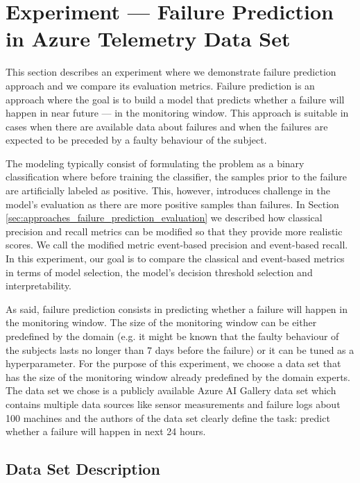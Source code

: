 \section{Experiment --- Failure Prediction in Azure Telemetry Data Set}
\label{sec:experiments_failure_prediction}

This section describes an experiment where we demonstrate failure prediction approach and we compare its evaluation metrics.
Failure prediction is an approach where the goal is to build a model that predicts whether a failure will happen in near future --- in the monitoring window.
This approach is suitable in cases when there are available data about failures and when the failures are expected to be preceded by a faulty behaviour of the subject.

The modeling typically consist of formulating the problem as a binary classification where before training the classifier, the samples prior to the failure are artificially labeled as positive.
This, however, introduces challenge in the model's evaluation as there are more positive samples than failures.
In Section \ref{sec:approaches_failure_prediction_evaluation} we described how classical precision and recall metrics can be modified so that they provide more realistic scores.
We call the modified metric event-based precision and event-based recall.
In this experiment, our goal is to compare the classical and event-based metrics in terms of model selection, the model's decision threshold selection and interpretability.

As said, failure prediction consists in predicting whether a failure will happen in the monitoring window.
The size of the monitoring window can be either predefined by the domain (e.g. it might be known that the faulty behaviour of the subjects lasts no longer than 7 days before the failure) or it can be tuned as a hyperparameter.
For the purpose of this experiment, we choose a data set that has the size of the monitoring window already predefined by the domain experts.
The data set we chose is a publicly available Azure AI Gallery data set \cite{data_set_azure_ai_gallery} which contains multiple data sources like sensor measurements and failure logs about 100 machines and the authors of the data set clearly define the task: predict whether a failure will happen in next 24 hours.

\subsection{Data Set Description}

